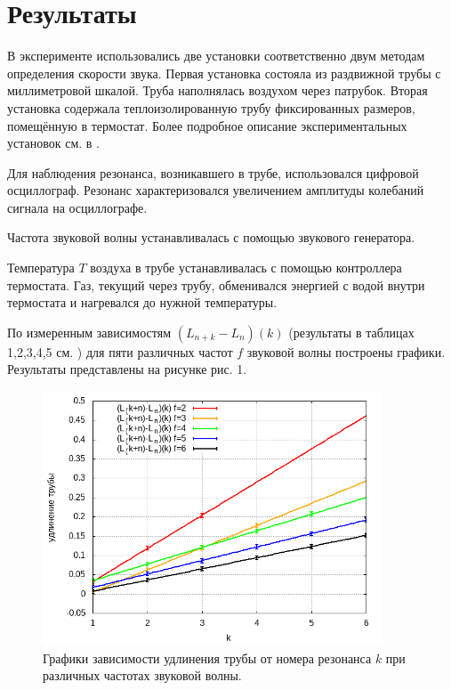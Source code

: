 \section{Результаты}

В эксперименте использовались две установки соответственно двум методам определения скорости звука. Первая установка состояла из раздвижной трубы с миллиметровой шкалой. Труба наполнялась воздухом через патрубок. Вторая установка содержала теплоизолированную трубу фиксированных размеров, помещённую в термостат. Более подробное описание экспериментальных установок см. в .

Для наблюдения резонанса, возникавшего в трубе, использовался цифровой осциллограф. Резонанс характеризовался увеличением амплитуды колебаний сигнала на осциллографе.

Частота звуковой волны устанавливалась с помощью звукового генератора.

Температура $T$ воздуха в трубе устанавливалась с помощью контроллера термостата. Газ, текущий через трубу, обменивался энергией с водой внутри термостата и нагревался до нужной температуры.

По измеренным зависимостям $(L_{n+k} - L_n)(k)$ (результаты в таблицах 1,2,3,4,5 см. ) для пяти различных частот $f$ звуковой волны построены графики. Результаты представлены на рисунке рис. 1.

\begin{figure} [h]
    \label{figure1}
    \includegraphics[width=0.9\textwidth]{img/graph9.png}

    \caption{Графики зависимости удлинения трубы от номера резонанса $k$ при различных частотах звуковой волны.}
    
\end{figure}

